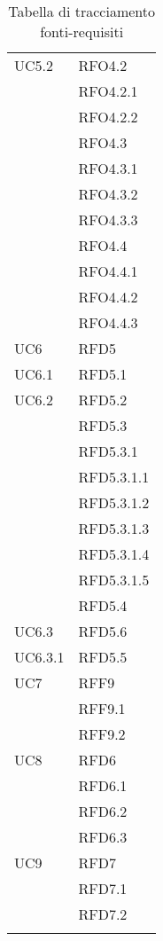 \begin{center}
\begin{longtable}{ | >{\centering\arraybackslash}m{5cm} | >{\centering\arraybackslash}m{5cm} | }
        UC5.2 & RFO4.2\\
            & RFO4.2.1 \\
            & RFO4.2.2 \\
            & RFO4.3 \\
            & RFO4.3.1 \\
            & RFO4.3.2 \\
            & RFO4.3.3 \\
            & RFO4.4 \\
            & RFO4.4.1 \\
            & RFO4.4.2 \\
            & RFO4.4.3 \\
\hline

        UC6 & RFD5\\
\hline

        UC6.1 & RFD5.1\\
\hline

        UC6.2 & RFD5.2\\
            & RFD5.3 \\
            & RFD5.3.1 \\
            & RFD5.3.1.1 \\
            & RFD5.3.1.2 \\
            & RFD5.3.1.3 \\
            & RFD5.3.1.4 \\
            & RFD5.3.1.5 \\
            & RFD5.4 \\
\hline

        UC6.3 & RFD5.6\\
\hline

        UC6.3.1 & RFD5.5\\
\hline

        UC7 & RFF9\\
            & RFF9.1 \\
            & RFF9.2 \\
\hline

        UC8 & RFD6\\
            & RFD6.1 \\
            & RFD6.2 \\
            & RFD6.3 \\
\hline

        UC9 & RFD7\\
            & RFD7.1 \\
            & RFD7.2 \\
\hline



       	\caption[Tracciamento fonti-requisiti]{Tabella di tracciamento fonti-requisiti}
	\end{longtable}
	
\end{center}
